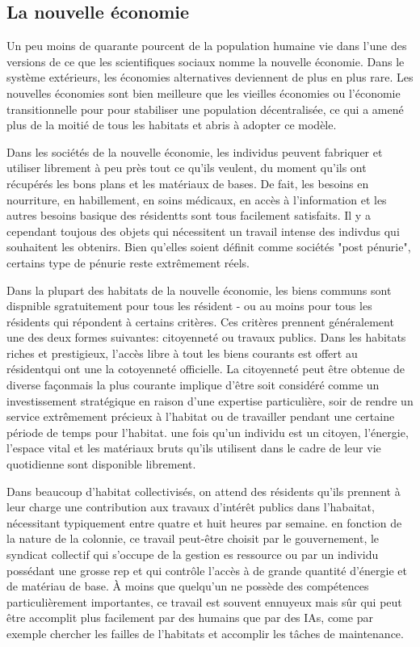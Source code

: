               \subsection{La nouvelle économie} \label{sec:new-economy} 

               Un peu moins de quarante pourcent de la population humaine vie dans l'une des versions de ce que les scientifiques sociaux nomme la nouvelle économie. Dans le système extérieurs, les économies alternatives deviennent de plus en plus rare. Les nouvelles économies sont bien meilleure que les vieilles économies ou l'économie transitionnelle pour pour stabiliser une population décentralisée, ce qui a amené plus de la moitié de tous les habitats et abris à adopter ce modèle. 

               Dans les sociétés de la nouvelle économie, les individus peuvent fabriquer et utiliser librement à peu près tout ce qu'ils veulent, du moment qu'ils ont récupérés les bons plans et les matériaux de bases. De fait, les besoins en nourriture, en habillement, en soins médicaux, en accès à l'information et les autres besoins basique des résidentts sont tous facilement satisfaits. Il y a cependant toujous des objets qui nécessitent un travail intense des indivdus qui souhaitent les obtenirs. Bien qu'elles soient définit comme sociétés "post pénurie", certains type de pénurie reste extrêmement réels. 

               Dans la plupart des habitats de la nouvelle économie, les biens communs sont dispnible sgratuitement pour tous les résident - ou au moins pour tous les résidents qui répondent à certains critères. Ces critères prennent généralement une des deux formes suivantes: citoyenneté ou travaux publics. Dans les habitats riches et prestigieux, l'accès libre à tout les biens courants est offert au résidentqui ont une la cotoyenneté officielle. La citoyenneté peut être obtenue de diverse façonmais la plus courante implique d'être soit considéré comme un investissement stratégique en raison d'une expertise particulière, soir de rendre un service extrêmement précieux à l'habitat ou de travailler pendant une certaine période de temps pour l'habitat. une fois qu'un individu est un citoyen, l'énergie, l'espace vital et les matériaux bruts qu'ils utilisent dans le cadre de leur vie quotidienne sont disponible librement. 

               Dans beaucoup d'habitat collectivisés, on attend des résidents qu'ils prennent à leur charge une contribution aux travaux d'intérêt publics dans l'habaitat, nécessitant typiquement entre quatre et huit heures par semaine. en fonction de la nature de la colonnie, ce travail peut-être choisit par le gouvernement, le syndicat collectif qui s'occupe de la gestion es ressource ou par un individu possédant une grosse rep et qui contrôle l'accès à de grande quantité d'énergie et de matériau de base. À moins que quelqu'un ne possède des compétences particulièrement importantes, ce travail est souvent ennuyeux mais sûr qui peut être accomplit plus facilement par des humains que par des IAs, come par exemple chercher les failles de l'habitats et accomplir les tâches de maintenance. 

